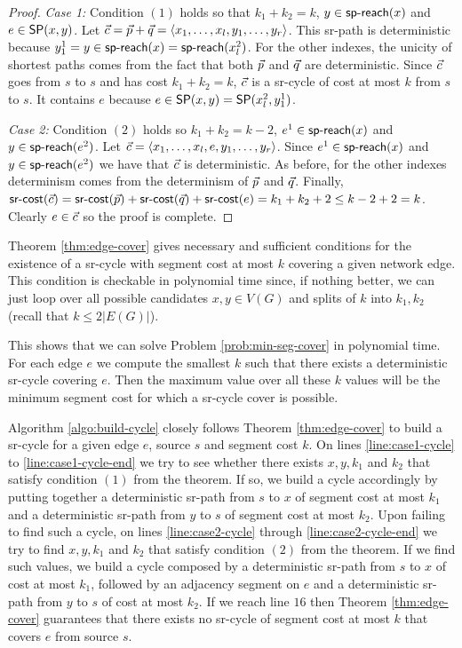 \begin{proof}
\emph{Case 1:} Condition $(1)$ holds so that $k_1 + k_2 = k$, $y \in \spreach(x)$ and $e \in \sp(x, y)$. 
Let $\sr{c} = \sr{p} + \sr{q} = \langle x_1, \ldots, x_l, y_1, \ldots, y_r \rangle$. 
This sr-path is deterministic because $y^1_1 = y \in \spreach(x) = \spreach(x^2_l)$. 
For the other indexes, the unicity of shortest paths comes from the fact that both $\sr{p}$ and $\sr{q}$
are deterministic. Since $\sr{c}$ goes from $s$ to $s$ and has cost $k_1 + k_2 = k$, $\sr{c}$ is a sr-cycle of cost at most $k$ from $s$ to $s$.
It contains $e$ because $e \in \sp(x, y) = \sp(x^2_l, y^1_1)$.

\emph{Case 2:} Condition $(2)$ holds so $k_1 + k_2 = k - 2$, $e^1 \in \spreach(x)$ and $y \in \spreach(e^2)$. Let $\sr{c} = \langle x_1, \ldots, x_l, e, y_1, \ldots, y_r \rangle$.
Since $e^1 \in \spreach(x)$ and $y \in \spreach(e^2)$ we have that $\sr{c}$ is deterministic. As before, for the other indexes determinism comes from the 
determinism of $\sr{p}$ and $\sr{q}$. Finally, $\cost(\sr{c}) = \cost(\sr{p}) + \cost(\sr{q}) + \cost(e) = k_1 + k_2 + 2 \leq k - 2 + 2 = k$. Clearly $e \in \sr{c}$
so the proof is complete.
\end{proof}

Theorem \ref{thm:edge-cover} gives necessary and sufficient conditions for the existence of a sr-cycle with segment cost at most $k$
covering a given network edge. This condition is checkable in polynomial time since, if nothing better, we can just loop over all possible
candidates $x, y \in V(G)$ and splits of $k$ into $k_1, k_2$ (recall that $k \leq 2|E(G)|$).

This shows that we can solve Problem \ref{prob:min-seg-cover} in polynomial time. For each edge $e$ we compute the smallest $k$ such that
there exists a deterministic sr-cycle covering $e$. Then the maximum value over all these $k$ values will be the minimum segment cost
for which a sr-cycle cover is possible.

Algorithm \ref{algo:build-cycle} closely follows Theorem \ref{thm:edge-cover} to build a sr-cycle for a given edge $e$, source $s$ and segment cost $k$.
On lines \ref{line:case1-cycle} to \ref{line:case1-cycle-end} we try to see whether there exists $x, y, k_1$ and $k_2$ that satisfy condition $(1)$ from the 
theorem. If so, we build a cycle accordingly by putting together a deterministic sr-path from $s$ to $x$ of segment cost at most $k_1$ and a deterministic sr-path
from $y$ to $s$ of segment cost at most $k_2$. Upon failing to find such a cycle, on lines \ref{line:case2-cycle} through \ref{line:case2-cycle-end} we try to find 
$x, y, k_1$ and $k_2$ that satisfy condition $(2)$ from the theorem. If we find such values, we build a cycle composed by a deterministic sr-path from $s$ to $x$ of cost at most $k_1$,
followed by an adjacency segment on $e$ and a deterministic sr-path from $y$ to $s$ of cost at most $k_2$. If we reach line $16$ then Theorem \ref{thm:edge-cover} guarantees that
there exists no sr-cycle of segment cost at most $k$ that covers $e$ from source $s$.

